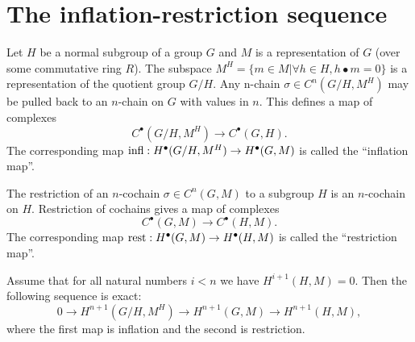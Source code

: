 \section{The inflation-restriction sequence}


\begin{definition}
	Let $H$ be a normal subgroup of a group $G$ and $M$ is
	a representation of $G$ (over some commutative ring $R$).
	The subspace $M^H = \{m \in M | \forall h \in H, h \bullet m = 0\}$ is
	a representation of the quotient group $G / H$.
	Any n-chain $\sigma \in C^n(G/H,M^H)$ may be pulled back to an
	$n$-chain on $G$ with values in $n$. This defines a map of complexes
	\[
		C^\bullet(G/H, M^H) \to C^\bullet(G,H).
	\]
	The corresponding map $\mathrm{infl} : H^\bullet(G/H, M^H) \to H^\bullet(G,M)$
	is called the ``inflation map''.
\end{definition}


\begin{definition}
	The restriction of an $n$-cochain $\sigma\in C^n(G,M)$ to a subgroup $H$
	is an $n$-cochain on $H$. Restriction of cochains gives a map of complexes
	\[
		C^\bullet(G,M) \to C^\bullet(H,M).
	\]
	The corresponding map $\mathrm{rest} : H^\bullet(G,M) \to H^\bullet(H,M)$ is called the
	``restriction map''.
\end{definition}

\begin{theorem}
	Assume that for all natural numbers $i < n$ we have $H^{i+1}(H,M)=0$.
	Then the following sequence is exact:
	\[
		0 \to H^{n+1}(G/H, M^H) \to H^{n+1}(G,M) \to H^{n+1}(H,M),
	\]
	where the first map is inflation and the second is restriction.
\end{theorem}

